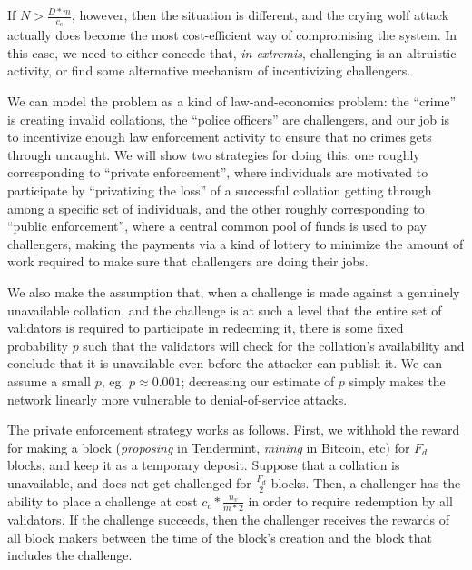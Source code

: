 \documentclass[11pt,a4paper]{article}
\theoremstyle{plain}
\theoremstyle{definition}
\theoremstyle{remark}
\begin{document}
If $N > \frac{D * m}{c_c}$, however, then the situation is different, and the crying wolf attack actually does become the most cost-efficient way of compromising the system. In this case, we need to either concede that, \emph{in extremis}, challenging is an altruistic activity, or find some alternative mechanism of incentivizing challengers.

We can model the problem as a kind of law-and-economics problem: the ``crime'' is creating invalid collations, the ``police officers'' are challengers, and our job is to incentivize enough law enforcement activity to ensure that no crimes gets through uncaught. We will show two strategies for doing this, one roughly corresponding to ``private enforcement'', where individuals are motivated to participate by ``privatizing the loss'' of a successful collation getting through among a specific set of individuals, and the other roughly corresponding to ``public enforcement'', where a central common pool of funds is used to pay challengers, making the payments via a kind of lottery to minimize the amount of work required to make sure that challengers are doing their jobs.

We also make the assumption that, when a challenge is made against a genuinely unavailable collation, and the challenge is at such a level that the entire set of validators is required to participate in redeeming it, there is some fixed probability $p$ such that the validators will check for the collation's availability and conclude that it is unavailable even before the attacker can publish it. We can assume a small $p$, eg. $p \approx 0.001$; decreasing our estimate of $p$ simply makes the network linearly more vulnerable to denial-of-service attacks.

The private enforcement strategy works as follows. First, we withhold the reward for making a block (\emph{proposing} in Tendermint, \emph{mining} in Bitcoin, etc) for $F_d$ blocks, and keep it as a temporary deposit. Suppose that a collation is unavailable, and does not get challenged for $\frac{F_d}{2}$ blocks. Then, a challenger has the ability to place a challenge at cost $c_c * \frac{n_v}{m * 2}$ in order to require redemption by all validators. If the challenge succeeds, then the challenger receives the rewards of all block makers between the time of the block's creation and the block that includes the challenge.
\end{document}
